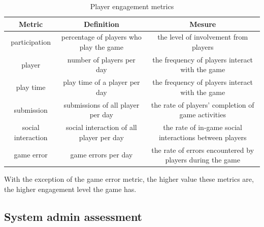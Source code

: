 \documentclass[11pt,oneside]{book}
\newcommand\tabhead[1]{\small\textbf{#1}}
\begin{document}
\begin{table}[ht!]
  \centering
  \begin{tabular}{|c|c|c|}
    \hline
    \multicolumn{1}{|p{0.2\columnwidth}|}{\centering\tabhead{Metric}} &
    \multicolumn{1}{|p{0.3\columnwidth}|}{\centering\tabhead{Definition}} &
    \multicolumn{1}{|p{0.35\columnwidth}|}{\centering\tabhead{Mesure}} \\
    \hline
    \multicolumn{1}{|p{0.2\columnwidth}|}{participation} &
    \multicolumn{1}{|p{0.3\columnwidth}|}{percentage of players who play the game} &
    \multicolumn{1}{|p{0.35\columnwidth}|}{the level of involvement from players} \\
    \hline
    \multicolumn{1}{|p{0.2\columnwidth}|}{player} &
    \multicolumn{1}{|p{0.3\columnwidth}|}{number of players per day} &
    \multicolumn{1}{|p{0.35\columnwidth}|}{the frequency of players interact with the game} \\
    \hline
    \multicolumn{1}{|p{0.2\columnwidth}|}{play time} &
    \multicolumn{1}{|p{0.3\columnwidth}|}{play time of a player per day} &
    \multicolumn{1}{|p{0.35\columnwidth}|}{the frequency of players interact with the game} \\
    \hline
    \multicolumn{1}{|p{0.2\columnwidth}|}{submission} &
    \multicolumn{1}{|p{0.3\columnwidth}|}{submissions of all player per day} &
    \multicolumn{1}{|p{0.35\columnwidth}|}{the rate of players' completion of game activities} \\
    \hline
    \multicolumn{1}{|p{0.2\columnwidth}|}{social interaction} &
    \multicolumn{1}{|p{0.3\columnwidth}|}{social interaction of all player per day} &
    \multicolumn{1}{|p{0.35\columnwidth}|}{the rate of in-game social interactions between players} \\
    \hline
    \multicolumn{1}{|p{0.2\columnwidth}|}{game error} &
    \multicolumn{1}{|p{0.3\columnwidth}|}{game errors per day} &
    \multicolumn{1}{|p{0.35\columnwidth}|}{the rate of errors encountered by players during the game} \\
    \hline
  \end{tabular}
  \caption{Player engagement metrics}
  \label{table:engagement-metrics}
\end{table}

With the exception of the game error metric, the higher value these metrics are, the higher engagement level the game has.

\subsection{System admin assessment}
\end{document}
